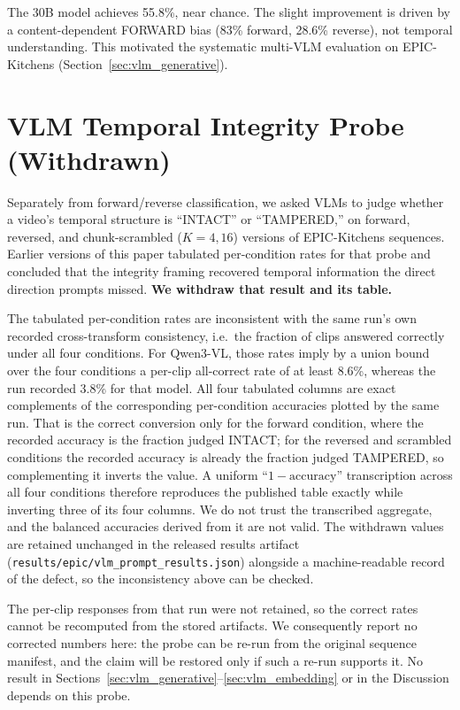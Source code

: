 \documentclass{article}
\theoremstyle{remark}
\begin{document}
The 30B model achieves 55.8\%, near chance. The slight improvement is driven by a content-dependent FORWARD bias (83\% forward, 28.6\% reverse), not temporal understanding. This motivated the systematic multi-VLM evaluation on EPIC-Kitchens (Section~\ref{sec:vlm_generative}).

\section{VLM Temporal Integrity Probe (Withdrawn)}
\label{sec:integrity_probe}

Separately from forward/reverse classification, we asked VLMs to judge whether a video's temporal structure is ``INTACT'' or ``TAMPERED,'' on forward, reversed, and chunk-scrambled ($K\!=\!4, 16$) versions of EPIC-Kitchens sequences. Earlier versions of this paper tabulated per-condition rates for that probe and concluded that the integrity framing recovered temporal information the direct direction prompts missed. \textbf{We withdraw that result and its table.}

The tabulated per-condition rates are inconsistent with the same run's own recorded cross-transform consistency, i.e.\ the fraction of clips answered correctly under all four conditions. For Qwen3-VL, those rates imply by a union bound over the four conditions a per-clip all-correct rate of at least 8.6\%, whereas the run recorded 3.8\% for that model. All four tabulated columns are exact complements of the corresponding per-condition accuracies plotted by the same run. That is the correct conversion only for the forward condition, where the recorded accuracy is the fraction judged INTACT; for the reversed and scrambled conditions the recorded accuracy is already the fraction judged TAMPERED, so complementing it inverts the value. A uniform ``$1-\text{accuracy}$'' transcription across all four conditions therefore reproduces the published table exactly while inverting three of its four columns. We do not trust the transcribed aggregate, and the balanced accuracies derived from it are not valid. The withdrawn values are retained unchanged in the released results artifact (\texttt{results/epic/vlm\_prompt\_results.json}) alongside a machine-readable record of the defect, so the inconsistency above can be checked.

The per-clip responses from that run were not retained, so the correct rates cannot be recomputed from the stored artifacts. We consequently report no corrected numbers here: the probe can be re-run from the original sequence manifest, and the claim will be restored only if such a re-run supports it. No result in Sections~\ref{sec:vlm_generative}--\ref{sec:vlm_embedding} or in the Discussion depends on this probe.
\end{document}
